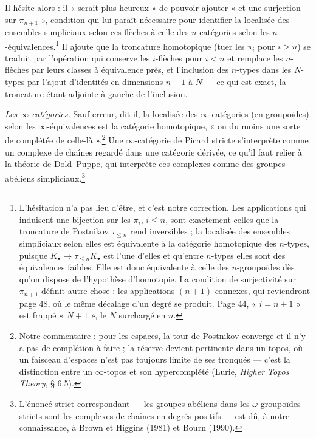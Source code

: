 \documentclass[11pt,a4paper]{article}
\begin{document}
Il hésite alors : il « serait plus heureux » de pouvoir ajouter « et une
surjection sur $\pi_{n+1}$ », condition qui lui paraît nécessaire pour
identifier la localisée des ensembles simpliciaux selon ces flèches à celle
des $n$-catégories selon les $n$-équivalences.\footnote{L'hésitation n'a pas
lieu d'être, et c'est notre correction. Les applications qui induisent une
bijection sur les $\pi_i$, $i \leqslant n$, sont exactement celles que la
troncature de Postnikov $\tau_{\leqslant n}$ rend inversibles ; la localisée
des ensembles simpliciaux selon elles est équivalente à la catégorie
homotopique des $n$-types, puisque $K_\bullet \to \tau_{\leqslant n}K_\bullet$
est l'une d'elles et qu'entre $n$-types elles sont des équivalences faibles.
Elle est donc équivalente à celle des $n$-groupoïdes dès qu'on dispose de
l'hypothèse d'homotopie. La condition de surjectivité sur $\pi_{n+1}$ définit
autre chose : les applications $(n+1)$-connexes, qui reviendront page 48, où
le même décalage d'un degré se produit. Page 44, « $i = n+1$ » est frappé
« $N+1$ », le $N$ surchargé en $n$.} Il ajoute que la troncature homotopique
(tuer les $\pi_i$ pour $i > n$) se traduit par l'opération qui conserve les
$i$-flèches pour $i < n$ et remplace les $n$-flèches par leurs classes à
équivalence près, et l'inclusion des $n$-types dans les $N$-types par l'ajout
d'identités en dimensions $n+1$ à $N$ --- ce qui est exact, la troncature
étant adjointe à gauche de l'inclusion.

\emph{Les $\infty$-catégories.} Sauf erreur, dit-il, la localisée des
$\infty$-catégories (en groupoïdes) selon les $\infty$-équivalences est la
catégorie homotopique, « ou du moins une sorte de complétée de
celle-là ».\footnote{Notre commentaire : pour les espaces, la tour de
Postnikov converge et il n'y a pas de complétion à faire ; la réserve devient
pertinente dans un topos, où un faisceau d'espaces n'est pas toujours limite
de ses tronqués --- c'est la distinction entre un $\infty$-topos et son
hypercomplété (Lurie, \emph{Higher Topos Theory}, § 6.5).} Une
$\infty$-catégorie de Picard stricte s'interprète comme un complexe de
chaînes regardé dans une catégorie dérivée, ce qu'il faut relier à la
théorie de Dold--Puppe, qui interprète ces complexes comme des groupes
abéliens simpliciaux.\footnote{L'énoncé strict correspondant --- les
groupes abéliens dans les $\omega$-groupoïdes stricts sont les complexes de
chaînes en degrés positifs --- est dû, à notre connaissance, à Brown et
Higgins (1981) et Bourn (1990).}
\end{document}
